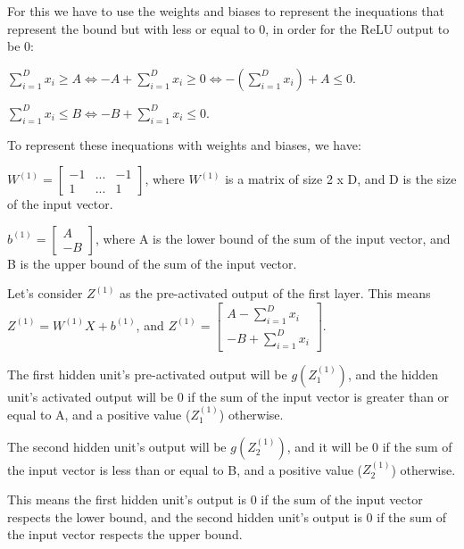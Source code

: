 \documentclass{article}
\begin{document}
For this we have to use the weights and biases to represent the inequations that represent the bound but with less or equal to 0, in order for
the ReLU output to be 0:

\bigskip

$ \sum_{i=1}^{D} x_i \geq A \iff -A + \sum_{i=1}^{D} x_i \geq 0 \iff -(\sum_{i=1}^{D} x_i) + A \leq 0$.

\medskip

$ \sum_{i=1}^{D} x_i \leq B \iff -B + \sum_{i=1}^{D} x_i \leq 0$.

\bigskip

To represent these inequations with weights and biases, we have:

\bigskip

\( W^{(1)} = \begin{bmatrix}
    -1 & ...  & -1\\
    1 & ... & 1
\end{bmatrix}
\), where \(W^{(1)}\) is a matrix of size 2 x D, and D is the size of the input vector.

\bigskip

\(b^{(1)} = \begin{bmatrix}
    A\\
    -B
\end{bmatrix}
\), where A is the lower bound of the sum of the input vector, and B is the upper bound of the sum of the input vector.

\bigskip

Let's consider $Z^{(1)}$ as the pre-activated output of the first layer. This means $Z^{(1)} = W^{(1)}X + b^{(1)}$, and
$Z^{(1)} = \begin{bmatrix}
    A -\sum_{i=1}^{D} x_i\\
    -B + \sum_{i=1}^{D} x_i
\end{bmatrix}
$.

\bigskip

The first hidden unit's pre-activated output will be $g(Z_1^{(1)})$, and the hidden unit's activated output 
will be 0 if the sum of the input vector is greater than or equal to A, and a positive value ($Z_1^{(1)}$) otherwise.

The second hidden unit's output will be $g(Z_2^{(1)})$, and it will be 0 if the sum of the input vector is less than or equal to B, 
and a positive value ($Z_2^{(1)}$) otherwise.

This means the first hidden unit's output is 0 if the sum of the input vector respects the lower bound, 
and the second hidden unit's output is 0 if the sum of the input vector respects the upper bound.
\end{document}

